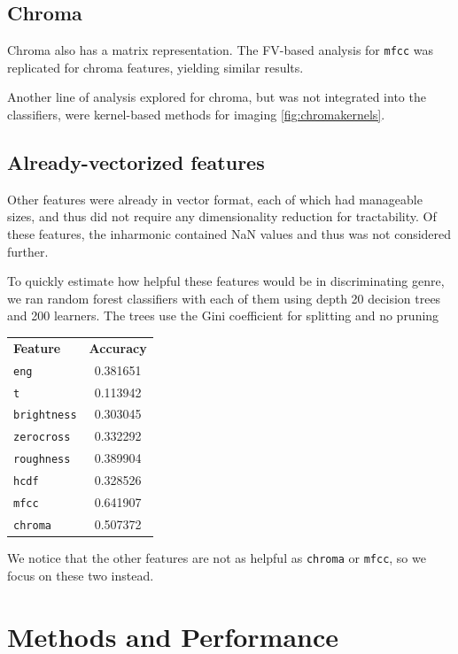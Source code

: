 \documentclass{article}
\begin{document}
\subsection{Chroma}

Chroma also has a matrix representation. The FV-based analysis for \texttt{mfcc} was replicated for chroma features, yielding similar results.

Another line of analysis explored for chroma, but was not integrated into the classifiers, were kernel-based methods for imaging \ref{fig:chromakernels}.

\subsection{Already-vectorized features}

Other features were already in vector format, each of which had manageable sizes, and thus did not require any dimensionality reduction for tractability. Of these features, the inharmonic contained NaN values and thus was not considered further.

To quickly estimate how helpful these features would be in discriminating genre,
we ran random forest classifiers with each of them using depth 20 decision trees and 200 learners. The trees use the Gini coefficient for splitting and no pruning

\begin{center}
\begin{tabular}{l|c}
    {\bf Feature}   &   {\bf Accuracy} \\
\texttt{eng} & 0.381651 \\
\texttt{t} & 0.113942 \\
\texttt{brightness} & 0.303045 \\
\texttt{zerocross} & 0.332292 \\
\texttt{roughness} & 0.389904 \\
\texttt{hcdf} & 0.328526 \\
\texttt{mfcc} & 0.641907 \\
\texttt{chroma} & 0.507372 \\
\end{tabular}
\end{center}

We notice that the other features are not as helpful as \texttt{chroma} or \texttt{mfcc}, so we focus on these two instead.

\section{Methods and Performance}
\end{document}
